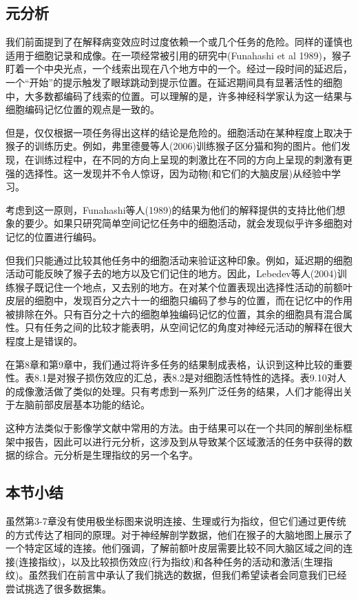 \subsection{ 元分析}
我们前面提到了在解释病变效应时过度依赖一个或几个任务的危险。同样的谨慎也适用于细胞记录和成像。在一项经常被引用的研究中(Funahashi et al 1989)，猴子盯着一个中央光点，一个线索出现在八个地方中的一个。经过一段时间的延迟后，一个“开始”的提示触发了眼球跳动到提示位置。在延迟期间具有显著活性的细胞中，大多数都编码了线索的位置。可以理解的是，许多神经科学家认为这一结果与细胞编码记忆位置的观点是一致的。

\par
但是，仅仅根据一项任务得出这样的结论是危险的。细胞活动在某种程度上取决于猴子的训练历史。例如，弗里德曼等人(2006)训练猴子区分猫和狗的图片。他们发现，在训练过程中，在不同的方向上呈现的刺激比在不同的方向上呈现的刺激有更强的选择性。这一发现并不令人惊讶，因为动物(和它们的大脑皮层)从经验中学习。

\par
考虑到这一原则，Funahashi等人(1989)的结果为他们的解释提供的支持比他们想象的要少。如果只研究简单空间记忆任务中的细胞活动，就会发现似乎许多细胞对记忆的位置进行编码。


\par
但我们只能通过比较其他任务中的细胞活动来验证这种印象。例如，延迟期的细胞活动可能反映了猴子去的地方以及它们记住的地方。因此，Lebedev等人(2004)训练猴子既记住一个地点，又去别的地方。在对某个位置表现出选择性活动的前额叶皮层的细胞中，发现百分之六十一的细胞只编码了参与的位置，而在记忆中的作用被排除在外。只有百分之十六的细胞单独编码记忆的位置，其余的细胞具有混合属性。只有任务之间的比较才能表明，从空间记忆的角度对神经元活动的解释在很大程度上是错误的。


\par
在第8章和第9章中，我们通过将许多任务的结果制成表格，认识到这种比较的重要性。表8.1是对猴子损伤效应的汇总，表8.2是对细胞活性特性的选择。表9.10对人的成像激活做了类似的处理。只有考虑到一系列广泛任务的结果，人们才能得出关于左脑前部皮层基本功能的结论。

\par
这种方法类似于影像学文献中常用的方法。由于结果可以在一个共同的解剖坐标框架中报告，因此可以进行元分析，这涉及到从导致某个区域激活的任务中获得的数据的综合。元分析是生理指纹的另一个名字。

\subsection{本节小结}
虽然第3-7章没有使用极坐标图来说明连接、生理或行为指纹，但它们通过更传统的方式传达了相同的原理。对于神经解剖学数据，他们在猴子的大脑地图上展示了一个特定区域的连接。他们强调，了解前额叶皮层需要比较不同大脑区域之间的连接(连接指纹)，以及比较损伤效应(行为指纹)和各种任务的活动和激活(生理指纹)。虽然我们在前言中承认了我们挑选的数据，但我们希望读者会同意我们已经尝试挑选了很多数据集。

